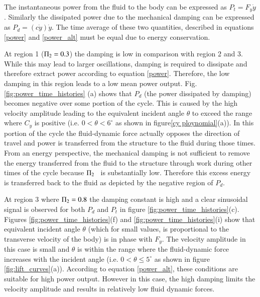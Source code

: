 

The instantaneous power from the fluid to the body can be expressed as $P_t=F_y\dot{y}$. Similarly the dissipated power due to the mechanical damping can be expressed as $P_d=(c\dot{y})\dot{y}$. The time average of these two quantities, described in equations \ref{power} and \ref{power_alt} must be equal due to energy conservation.
 
 

At region 1 ($\Pi_2=0.3$) the damping is low in comparison with region 2 and 3. While this may lead to larger oscillations, damping is required to dissipate and therefore extract power according to equation \ref{power}. Therefore, the low damping in this region leads to a low mean power output. Fig.\ref{fig:power_time_histories} (a) shows that $P_d$ (the power dissipated by damping) becomes negative over some portion of the cycle. This is caused by the high velocity amplitude leading to the equivalent incident angle $\theta$ to exceed the range where $C_y$ is positive (i.e. $0<\theta<6^\circ$ as shown in figure\ref{cy ploynomial}(a)). In this portion of the cycle the fluid-dynamic force actually opposes the direction of travel and power is transferred from the structure to the fluid during those times. From an energy perspective, the mechanical damping is not sufficient to remove the energy transferred from the fluid to the structure through work during other times of the cycle because $\Pi_2$ \ is substantially low. Therefore this excess energy is transferred back to the fluid as depicted by the negative region of $P_d$.

\vspace{1mm} 
At region 3 where $\Pi_2=0.8$ the damping constant is high and a clear sinusoidal signal is observed for both $P_d$ and $P_t$ in figure \ref{fig:power_time_histories}(c). Figures \ref{fig:power_time_histories}(f) and  \ref{fig:power_time_histories}(i) show that equivalent incident angle $\theta$ (which for small values, is proportional to the transverse velocity of the body) is in phase with $F_y$.  The velocity amplitude in this case is small and $\theta$ is within the range where the fluid-dynamic force increases with the incident angle (i.e. $0<\theta \leq 5^\circ$ as shown in figure \ref{fig:lift_curves}(a)). According to equation \ref{power_alt}, these conditions are suitable for high power output. However in this case, the high damping limits the velocity amplitude and results in relatively low fluid dynamic forces.
  
